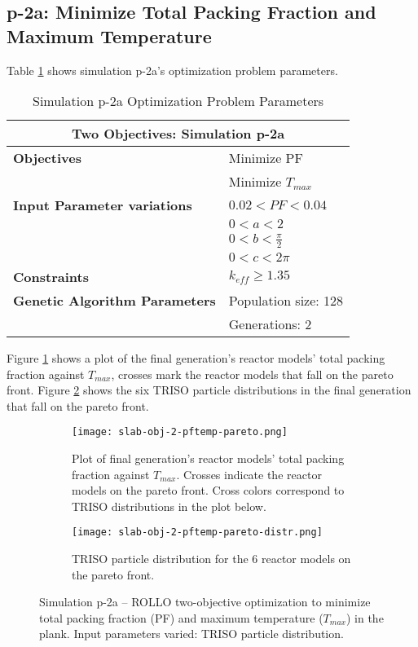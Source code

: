 
\subsection{p-2a: Minimize Total Packing Fraction and Maximum Temperature}
Table \ref{tab:simulationp2a} shows simulation p-2a's optimization problem parameters. 
\begin{table}[htbp]
    \centering
    \onehalfspacing
    \caption{Simulation p-2a Optimization Problem Parameters}
	\label{tab:simulationp2a}
    \footnotesize
    \begin{tabular}{l|p{3cm}}
    \hline 
    \multicolumn{2}{c}{\textbf{Two Objectives: Simulation p-2a}} \\
    \hline 
    \textbf{Objectives} & Minimize PF \\
    & Minimize $T_{max}$ \\
    \hline 
    \textbf{Input Parameter variations} & $0.02<PF<0.04$ \\
    & $0<a<2$ \\
    & $0<b<\frac{\pi}{2}$ \\
    & $0<c<2\pi$ \\
    \hline
    \textbf{Constraints} & $k_{eff} \geq 1.35$\\ 
    \hline 
    \textbf{Genetic Algorithm Parameters} & Population size: 128 \\
    & Generations: 2 \\
    \hline
    \end{tabular}
\end{table}
Figure \ref{fig:slab-obj-2-pftemp-pareto} shows a plot of the final generation's reactor models' 
total packing fraction against $T_{max}$, crosses mark the reactor models that fall on the pareto 
front.
Figure \ref{fig:slab-obj-2-pftemp-pareto-distr} shows the six TRISO particle distributions in 
the final generation that fall on the pareto front. 
\begin{figure}[htbp]
    \centering
    \begin{subfigure}{\textwidth}
        \texttt{[image: slab-obj-2-pftemp-pareto.png]}
        \caption{Plot of final generation's reactor models' total packing fraction against 
        $T_{max}$. Crosses indicate the reactor models on the pareto front. Cross colors correspond  
        to TRISO distributions in the plot below.}
        \label{fig:slab-obj-2-pftemp-pareto} 
    \end{subfigure}
    \begin{subfigure}{\textwidth}
        \texttt{[image: slab-obj-2-pftemp-pareto-distr.png]}
        \caption{TRISO particle distribution for the 6 reactor models on the pareto front.}
        \label{fig:slab-obj-2-pftemp-pareto-distr} 
    \end{subfigure}
    \caption{Simulation p-2a -- ROLLO two-objective optimization to minimize total packing fraction (PF) and  
    maximum temperature ($T_{max}$) in the plank. Input parameters varied: 
    TRISO particle distribution.}
    \label{fig:slab-obj-2-pftemp}
\end{figure}
